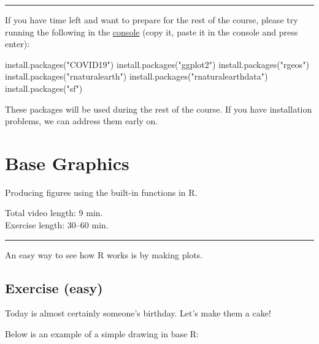 \documentclass[
]{book}
\newenvironment{Shaded}{\begin{snugshade}}{\end{snugshade}}
\newcommand{\FunctionTok}[1]{\textcolor[rgb]{0.00,0.00,0.00}{#1}}
\newcommand{\NormalTok}[1]{#1}
\newcommand{\StringTok}[1]{\textcolor[rgb]{0.31,0.60,0.02}{#1}}
\begin{document}
\begin{center}\rule{0.5\linewidth}{0.5pt}\end{center}

If you have time left and want to prepare for the rest of the course, please try running the following in the \href{https://youtu.be/AHAR7j-IUOw?t=133}{console} (copy it, paste it in the console and press enter):

\begin{Shaded}
\begin{Highlighting}[]
\FunctionTok{install.packages}\NormalTok{(}\StringTok{"COVID19"}\NormalTok{)}
\FunctionTok{install.packages}\NormalTok{(}\StringTok{"ggplot2"}\NormalTok{)}
\FunctionTok{install.packages}\NormalTok{(}\StringTok{"rgeos"}\NormalTok{)}
\FunctionTok{install.packages}\NormalTok{(}\StringTok{"rnaturalearth"}\NormalTok{)}
\FunctionTok{install.packages}\NormalTok{(}\StringTok{"rnaturalearthdata"}\NormalTok{)}
\FunctionTok{install.packages}\NormalTok{(}\StringTok{"sf"}\NormalTok{)}
\end{Highlighting}
\end{Shaded}

These packages will be used during the rest of the course. If you have installation problems, we can address them early on.

\hypertarget{base-graphics}{%
\chapter{Base Graphics}\label{base-graphics}}

Producing figures using the built-in functions in R.

Total video length: 9 min.\\
Exercise length: 30--60 min.

\begin{center}\rule{0.5\linewidth}{0.5pt}\end{center}

An easy way to see how R works is by making plots.

\hypertarget{exercise-easy}{%
\section{Exercise (easy)}\label{exercise-easy}}

Today is almost certainly someone's birthday. Let's make them a cake!

Below is an example of a simple drawing in base R:
\end{document}
